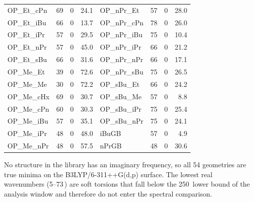 {\begin{longtable}{lrrr|lrrr}
OP\_Et\_cPn & 69 & 0 & 24.1 & OP\_nPr\_Et & 57 & 0 & 28.0 \\
OP\_Et\_iBu & 66 & 0 & 13.7 & OP\_nPr\_cPn & 78 & 0 & 26.0 \\
OP\_Et\_iPr & 57 & 0 & 29.5 & OP\_nPr\_iBu & 75 & 0 & 10.4 \\
OP\_Et\_nPr & 57 & 0 & 45.0 & OP\_nPr\_iPr & 66 & 0 & 21.2 \\
OP\_Et\_sBu & 66 & 0 & 31.6 & OP\_nPr\_nPr & 66 & 0 & 17.1 \\
OP\_Me\_Et & 39 & 0 & 72.6 & OP\_nPr\_sBu & 75 & 0 & 26.5 \\
OP\_Me\_Me & 30 & 0 & 72.2 & OP\_sBu\_Et & 66 & 0 & 24.2 \\
OP\_Me\_cHx & 69 & 0 & 30.7 & OP\_sBu\_Me & 57 & 0 & 8.8 \\
OP\_Me\_cPn & 60 & 0 & 30.3 & OP\_sBu\_iPr & 75 & 0 & 25.4 \\
OP\_Me\_iBu & 57 & 0 & 35.1 & OP\_sBu\_nPr & 75 & 0 & 24.1 \\
OP\_Me\_iPr & 48 & 0 & 48.0 & iBuGB & 57 & 0 & 4.9 \\
OP\_Me\_nPr & 48 & 0 & 57.5 & nPrGB & 48 & 0 & 30.6 \\
\end{longtable}}

\begin{flushleft}\footnotesize No structure in the library has an imaginary frequency, so
all 54 geometries are true minima on the B3LYP/6-311++G(d,p) surface. The lowest real
wavenumbers (5--73\,\wn) are soft torsions
that fall below the 250\,\wn{} lower bound of the analysis window and therefore do not
enter the spectral comparison.\end{flushleft}
